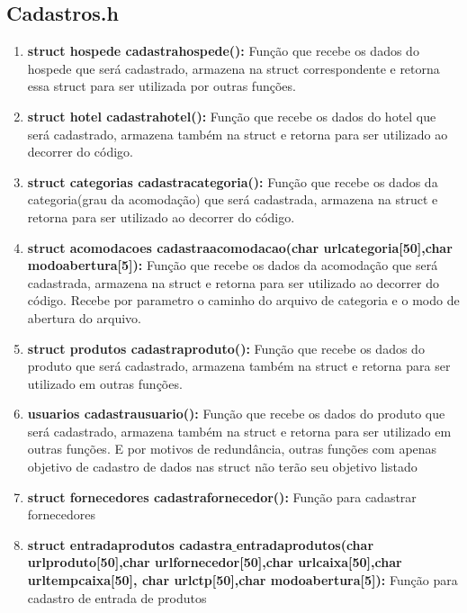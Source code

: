 \documentclass{article}
\begin{document}
\subsection{Cadastros.h}
\begin{enumerate}
	\item \textbf{struct hospede cadastrahospede(): }Função que recebe os dados do hospede que será cadastrado, armazena na struct correspondente e retorna essa struct para ser utilizada por outras funções.\\
	\item \textbf{struct hotel cadastrahotel(): }Função que recebe os dados do hotel que será cadastrado, armazena também na struct e retorna para ser utilizado ao decorrer do código.\\ 
	\item \textbf{struct categorias cadastracategoria(): }Função que recebe os dados da categoria(grau da acomodação) que será cadastrada, armazena na struct e retorna para ser utilizado ao decorrer do código.\\
	 \item \textbf{struct acomodacoes cadastraacomodacao(char urlcategoria[50],char modoabertura[5]): }Função que recebe os dados da acomodação que será cadastrada, armazena na struct e retorna para ser utilizado ao decorrer do código. Recebe por parametro o caminho do arquivo de categoria e o modo de abertura do arquivo.\\
	 \item \textbf{struct produtos cadastraproduto(): }Função que recebe os dados do produto que será cadastrado, armazena também na struct e retorna para ser utilizado em outras funções.\\ 
	 \item \textbf{usuarios cadastrausuario(): }Função que recebe os dados do produto que será cadastrado, armazena também na struct e retorna para ser utilizado em outras funções. E por motivos de redundância, outras funções com apenas objetivo de cadastro de dados nas struct não terão seu objetivo listado\\
	 \item \textbf{struct fornecedores cadastrafornecedor(): } Função para cadastrar fornecedores\\
	 \item \textbf{struct entradaprodutos cadastra$\_$entradaprodutos(char urlproduto[50],char urlfornecedor[50],char urlcaixa[50],char urltempcaixa[50],
	char urlctp[50],char modoabertura[5]): }Função para cadastro de entrada de produtos \\

\end{enumerate}
\end{document}
